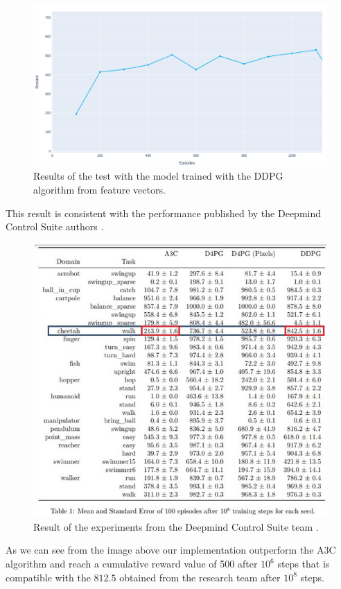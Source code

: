 \begin{figure}[H]
\centering
\includegraphics[width=.9\textwidth, height=.35\textheight]{pictures/ddpg_frame_as_input_test}
\caption{ Results of the test with the model trained with the DDPG algorithm from feature vectors.}
\end{figure}
This result is consistent with the performance published by the Deepmind Control Suite authors \cite{tassa2018deepmind}.

\begin{figure}[H]
\centering
\includegraphics[width=.75 \textwidth, height=.45 \textheight]{pictures/dmcs_ddpg_vs_a3c}
\caption{ Result of the experiments from the Deepmind Control Suite team \cite{tassa2018deepmind}.}
\end{figure}

As we can see from the image above our implementation outperform the A3C algorithm and reach a cumulative reward value of 500 after $10^6$ steps that is compatible with the $812.5$ obtained from the research team after $10^8$ steps.



